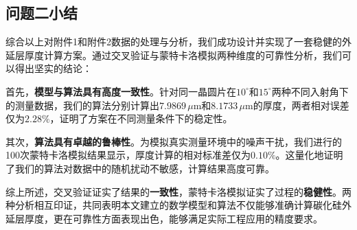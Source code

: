 \documentclass[withoutpreface,bwprint]{cumcmthesis} %
\begin{document}

\subsection{问题二小结}

综合以上对附件1和附件2数据的处理与分析，我们成功设计并实现了一套稳健的外延层厚度计算方案。通过交叉验证与蒙特卡洛模拟两种维度的可靠性分析，我们可以得出坚实的结论：

首先，\textbf{模型与算法具有高度一致性}。针对同一晶圆片在$10^\circ$和$15^\circ$两种不同入射角下的测量数据，我们的算法分别计算出$7.9869 \, \mu\text{m}$和$8.1733 \, \mu\text{m}$的厚度，两者相对误差仅为$2.28\%$，证明了方案在不同测量条件下的稳定性。

其次，\textbf{算法具有卓越的鲁棒性}。为模拟真实测量环境中的噪声干扰，我们进行的100次蒙特卡洛模拟结果显示，厚度计算的相对标准差仅为$0.10\%$。这量化地证明了我们的算法对数据中的随机扰动不敏感，计算结果高度可靠。

综上所述，交叉验证证实了结果的\textbf{一致性}，蒙特卡洛模拟证实了过程的\textbf{稳健性}。两种分析相互印证，共同表明本文建立的数学模型和算法不仅能够准确计算碳化硅外延层厚度，更在可靠性方面表现出色，能够满足实际工程应用的精度要求。

\end{document}
